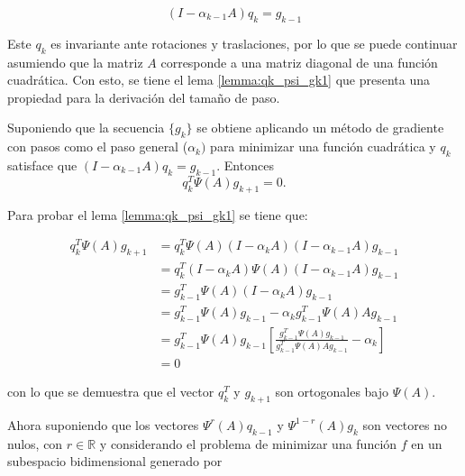 \begin{equation}
    (I-\alpha_{k-1}A)q_k = g_{k-1}
    \label{eq:qdef}
\end{equation}

Este $q_k$ es invariante ante rotaciones y traslaciones, por lo que se puede continuar asumiendo que la matriz $A$ corresponde a una matriz diagonal de una función cuadrática. Con esto, se tiene el lema \ref{lemma:qk_psi_gk1} que presenta una propiedad para la derivación del tamaño de paso.

\begin{lema}
    Suponiendo que la secuencia $\{g_k\}$ se obtiene aplicando un método de gradiente con pasos como el paso general ($\alpha_k)$ para minimizar una función cuadrática y $q_k$ satisface que $(I-\alpha_{k-1}A)q_k = g_{k-1}$. Entonces
    \begin{equation*}
        q_k^T\Psi(A)g_{k+1} = 0.
    \end{equation*}
    \label{lemma:qk_psi_gk1}
\end{lema}

Para probar el lema \ref{lemma:qk_psi_gk1} se tiene que:

\begin{align*}
    q_k^T \Psi(A)g_{k+1} & = q_k^T\Psi(A)(I-\alpha_kA)(I-\alpha_{k-1}A)g_{k-1}                                                    \\
                         & = q_k^T(I-\alpha_kA)\Psi(A)(I-\alpha_{k-1}A)g_{k-1}                                                    \\
                         & = g_{k-1}^T\Psi(A)(I-\alpha_kA)g_{k-1}                                                                 \\
                         & =g_{k-1}^T\Psi(A)g_{k-1}-\alpha_kg_{k-1}^T\Psi(A)Ag_{k-1}                                              \\
                         & =g_{k-1}^T\Psi(A)g_{k-1}\left[\frac{g_{k-1}^T\Psi(A)g_{k-1}}{g_{k-1}^T\Psi(A)Ag_{k-1}}-\alpha_k\right] \\
                         & = 0
\end{align*}

con lo que se demuestra que el vector $q_k^T$ y $g_{k+1}$ son ortogonales bajo $\Psi(A)$.

Ahora suponiendo que los vectores $\Psi^r(A)q_{k-1}$ y $\Psi^{1-r}(A)g_k$ son vectores no nulos, con $r\in\mathbb{R}$ y considerando el problema de minimizar una función $f$ en un subespacio bidimensional generado por

